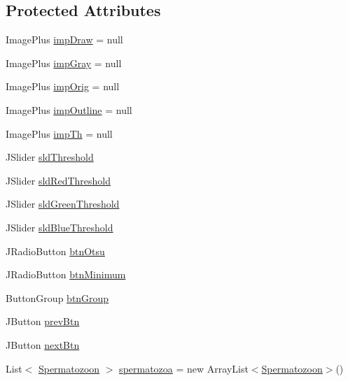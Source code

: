 \subsection*{Protected Attributes}
\begin{DoxyCompactItemize}
\item 
Image\+Plus \hyperlink{classgui_1_1_image_analysis_window_a4f0c94772d72a249a499259f6e49c7f0}{imp\+Draw} = null
\item 
Image\+Plus \hyperlink{classgui_1_1_image_analysis_window_a2f930a4d42790d6f5eec90929df33416}{imp\+Gray} = null
\item 
Image\+Plus \hyperlink{classgui_1_1_image_analysis_window_a69562d3583c362d2b643c170f0eae39f}{imp\+Orig} = null
\item 
Image\+Plus \hyperlink{classgui_1_1_image_analysis_window_af6d74fd318c36f34d66ca8a63271995e}{imp\+Outline} = null
\item 
Image\+Plus \hyperlink{classgui_1_1_image_analysis_window_a98940a0ff5c7eef6f6347a8c9c98c645}{imp\+Th} = null
\item 
J\+Slider \hyperlink{classgui_1_1_image_analysis_window_a7af6333e5eca6d48ffa96b4a3642836e}{sld\+Threshold}
\item 
J\+Slider \hyperlink{classgui_1_1_image_analysis_window_a1a8db00e5d10ad1bd10430a9753d764a}{sld\+Red\+Threshold}
\item 
J\+Slider \hyperlink{classgui_1_1_image_analysis_window_a0e48b8c00ce11da6e6289e2004ab84d5}{sld\+Green\+Threshold}
\item 
J\+Slider \hyperlink{classgui_1_1_image_analysis_window_a456745261d318a98ce73b904d412b99f}{sld\+Blue\+Threshold}
\item 
J\+Radio\+Button \hyperlink{classgui_1_1_image_analysis_window_a79b02cbaed083d22fac115fe05d1e8db}{btn\+Otsu}
\item 
J\+Radio\+Button \hyperlink{classgui_1_1_image_analysis_window_a0e7f4b261625dbbe93d3ac1bf2c645ad}{btn\+Minimum}
\item 
Button\+Group \hyperlink{classgui_1_1_image_analysis_window_a16d71c0ff3c7b5f2d7298752a949fc71}{btn\+Group}
\item 
J\+Button \hyperlink{classgui_1_1_image_analysis_window_ad7635bb9d707a780b5a81278b9bf8ff8}{prev\+Btn}
\item 
J\+Button \hyperlink{classgui_1_1_image_analysis_window_ad88013bcb23eecbb32f5e97911652f73}{next\+Btn}
\item 
List$<$ \hyperlink{classdata_1_1_spermatozoon}{Spermatozoon} $>$ \hyperlink{classgui_1_1_image_analysis_window_a7c449117b5c92c9b56bf822526a37da3}{spermatozoa} = new Array\+List$<$\hyperlink{classdata_1_1_spermatozoon}{Spermatozoon}$>$()

\end{DoxyCompactItemize}
